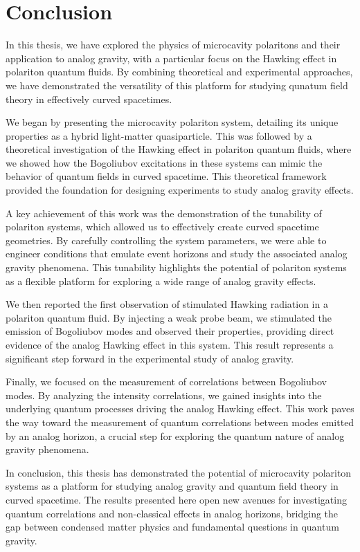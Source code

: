 

\chapter{Conclusion}

In this thesis, we have explored the physics of microcavity polaritons and their application to analog gravity, with a particular focus on the Hawking effect in polariton quantum fluids. By combining theoretical and experimental approaches, we have demonstrated the versatility of this platform for studying qunatum field theory in effectively curved spacetimes.

We began by presenting the microcavity polariton system, detailing its unique properties as a hybrid light-matter quasiparticle. This was followed by a theoretical investigation of the Hawking effect in polariton quantum fluids, where we showed how the Bogoliubov excitations in these systems can mimic the behavior of quantum fields in curved spacetime. This theoretical framework provided the foundation for designing experiments to study analog gravity effects.

A key achievement of this work was the demonstration of the tunability of polariton systems, which allowed us to effectively create curved spacetime geometries. By carefully controlling the system parameters, we were able to engineer conditions that emulate event horizons and study the associated analog gravity phenomena. This tunability highlights the potential of polariton systems as a flexible platform for exploring a wide range of analog gravity effects.

We then reported the first observation of stimulated Hawking radiation in a polariton quantum fluid. By injecting a weak probe beam, we stimulated the emission of Bogoliubov modes and observed their properties, providing direct evidence of the analog Hawking effect in this system. This result represents a significant step forward in the experimental study of analog gravity.

Finally, we focused on the measurement of correlations between Bogoliubov modes. By analyzing the intensity correlations, we gained insights into the underlying quantum processes driving the analog Hawking effect. This work paves the way toward the measurement of quantum correlations between modes emitted by an analog horizon, a crucial step for exploring the quantum nature of analog gravity phenomena.

In conclusion, this thesis has demonstrated the potential of microcavity polariton systems as a platform for studying analog gravity and quantum field theory in curved spacetime. The results presented here open new avenues for investigating quantum correlations and non-classical effects in analog horizons, bridging the gap between condensed matter physics and fundamental questions in quantum gravity.